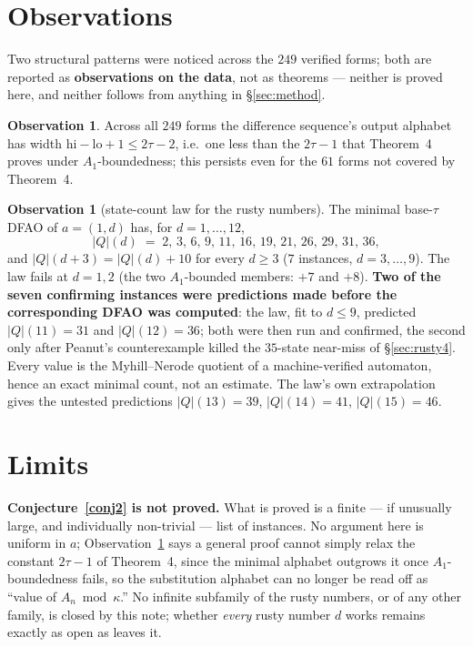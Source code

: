 \documentclass[10pt,reqno]{amsart}
\theoremstyle{plain}
\theoremstyle{definition}
\newtheorem{observation}[theorem]{Observation}
\theoremstyle{remark}
\numberwithin{theorem}{section}
\begin{document}
\section{Observations}
\label{sec:obs}

Two structural patterns were noticed across the $249$ verified forms; both are reported as
\textbf{observations on the data}, not as theorems --- neither is proved here, and neither
follows from anything in \S\ref{sec:method}.

\begin{observation}
\label{obs:window}
Across all $249$ forms the difference sequence's output alphabet has width $\mathrm{hi}-
\mathrm{lo}+1\le2\tau-2$, i.e.\ one less than the $2\tau-1$ that Theorem~4 proves under
$A_1$-boundedness; this persists even for the $61$ forms not covered by Theorem~4.
\end{observation}

\begin{observation}[state-count law for the rusty numbers]
\label{obs:law}
The minimal base-$\tau$ DFAO of $a=(1,d)$ has, for $d=1,\dots,12$,
\[
  |Q|(d) \;=\; 2,\,3,\,6,\,9,\,11,\,16,\,19,\,21,\,26,\,29,\,31,\,36 ,
\]
and $|Q|(d+3)=|Q|(d)+10$ for every $d\ge3$ ($7$ instances, $d=3,\dots,9$). The law fails at
$d=1,2$ (the two $A_1$-bounded members: $+7$ and $+8$). \textbf{Two of the seven confirming
instances were predictions made before the corresponding DFAO was computed}: the law, fit to
$d\le9$, predicted $|Q|(11)=31$ and $|Q|(12)=36$; both were then run and confirmed, the second
only after Peanut's counterexample killed the $35$-state near-miss of \S\ref{sec:rusty4}. Every
value is the Myhill--Nerode quotient of a machine-verified automaton, hence an exact minimal
count, not an estimate. The law's own extrapolation gives the untested predictions
$|Q|(13)=39$, $|Q|(14)=41$, $|Q|(15)=46$.
\end{observation}

\section{Limits}
\label{sec:limits}

\textbf{Conjecture~\ref{conj2} is not proved.} What is proved is a finite --- if unusually
large, and individually non-trivial --- list of instances. No argument here is uniform in $a$;
Observation~\ref{obs:law} says a general proof cannot simply relax the constant $2\tau-1$ of
Theorem~4, since the minimal alphabet outgrows it once $A_1$-boundedness fails, so the
substitution alphabet can no longer be read off as ``value of $A_n\bmod\kappa$.'' No infinite
subfamily of the rusty numbers, or of any other family, is closed by this note; whether
\emph{every} rusty number $d$ works remains exactly as open as \cite[\S6]{FJ} leaves it.
\end{document}
